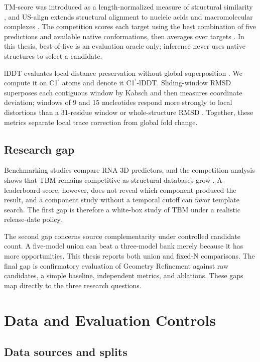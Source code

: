 \documentclass[12pt,a4paper,oneside]{report}
\newcommand{\cprime}{C1$^{\prime}$}
\begin{document}
TM-score was introduced as a length-normalized measure of structural similarity
\cite{tm_score}, and US-align extends structural alignment to nucleic acids and
macromolecular complexes \cite{usalign}. The competition scores each target using the
best combination of five predictions and available native conformations, then averages
over targets \cite{competition_paper}. In this thesis, best-of-five is an evaluation
oracle only; inference never uses native structures to select a candidate.

lDDT evaluates local distance preservation without global superposition \cite{lddt}.
We compute it on \cprime{} atoms and denote it \cprime{}-lDDT. Sliding-window RMSD
superposes each contiguous window by Kabsch and then measures coordinate deviation;
windows of 9 and 15 nucleotides respond more strongly to local distortions than a
31-residue window or whole-structure RMSD \cite{kabsch}. Together, these metrics separate
local trace correction from global fold change.

\section{Research gap}

Benchmarking studies compare RNA 3D predictors, and the competition analysis shows that
TBM remains competitive as structural databases grow
\cite{state_of_rnart,competition_paper}. A leaderboard score, however, does not reveal
which component produced the result, and a component study without a temporal cutoff
can favor template search. The first gap is therefore a white-box study of TBM under a
realistic release-date policy.

The second gap concerns source complementarity under controlled candidate count. A
five-model union can beat a three-model bank merely because it has more opportunities.
This thesis reports both union and fixed-N comparisons. The final gap is confirmatory
evaluation of Geometry Refinement against raw candidates, a simple baseline, independent
metrics, and ablations. These gaps map directly to the three research questions.

\chapter{Data and Evaluation Controls}
\label{chap:data_en}

\section{Data sources and splits}
\end{document}
